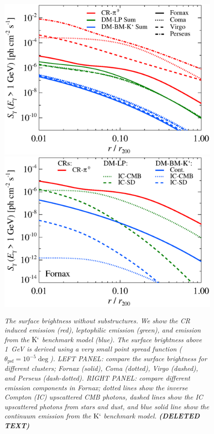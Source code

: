 \documentclass[10pt,aps,pra,reprint,amsmath,amsfonts,amssymb,showpacs]{revtex4-1}
\def\del#1{{\bf (DELETED TEXT)}}
\newcommand{\rmn}{\mathrm}
\newcommand{\Km}{\rmn{K}`}
\begin{document}
\begin{figure}
\begin{minipage}{2.0\columnwidth}
  \includegraphics[width=0.49\columnwidth]{figures/SB.v9.1GeV.SF300.noSuB.elmu.eps}
  \includegraphics[width=0.49\columnwidth]{figures/SB.fornax.v9.1GeV.SF300.noSuB.elmu.eps}
\caption{\it The surface brightness without substructures. We show the
  CR induced emission (red), leptophilic emission (green), and
  emission from the $\Km$ benchmark model (blue). The surface
  brightness above 1~GeV is derived using a very small point spread
  function ($\theta_\rmn{psf}=10^{-5}\deg$). LEFT PANEL: compare the
  surface brightness for different clusters; Fornax (solid), Coma
  (dotted), Virgo (dashed), and Perseus (dash-dotted).  RIGHT PANEL:
  compare different emission components in Fornax; dotted lines show
  the inverse Compton (IC) upscattered CMB photons, dashed lines show
  the IC upscattered photons from stars and dust, and blue solid line
  show the continuum emission from the $\Km$ benchmark
  model. \del{Since cooling is dominated by IR and UV processes in the
    center, the spatial dependence of the equilibrium electron spectra
    cancels the spatial dependence on the upscattered IR photon,
    resulting in a smooth halo dependence (density square) in the
    center. The spatial profile for the upscattered CMB photons is
    flatter in the center since the strong spatial dependence inferred
    from cooling counteracts the smooth halo contribution. Cluster
    outskirts dominated by the emission from DM, although large
    uncertainty in the gas density profile.}}
 \label{fig12}
\end{minipage}
\end{figure}
\end{document}
